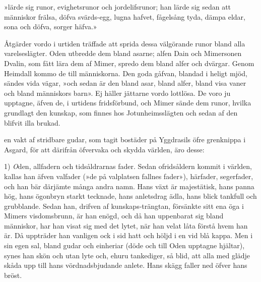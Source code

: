 {»lärde sig runor,}
{evighetsrunor}
{och jordelifsrunor;}
{han lärde sig sedan}
{att människor frälsa,}
{döfva svärds-egg,}
{lugna hafvet,}
{fågelsång tyda,}
{dämpa eldar,}
{sona och döfva,}
{sorger häfva.»}

Åtgärder vordo i urtiden träffade att sprida dessa välgörande runor
bland alla varelseslägter. Oden utbredde dem
bland asarne; alfen Dain och Mimersonen Dvalin, som fått lära dem af
Mimer, spredo dem bland alfer och dvärgar. Genom Heimdall kommo de till
människorna. Den goda gåfvan, blandad i heligt mjöd, sändes vida vägar,
»och sedan är den bland asar, bland alfer, bland visa vaner och bland
människors barn». Ej häller jättarne vordo lottlösa. De voro ju
upptagne, äfven de, i urtidens fridsförbund, och Mimer sände dem runor,
hvilka grundlagt den kunskap, som finnes hos Jotunheimsslägten och sedan
af den blifvit illa brukad.



\dropcapD en vakt af stridbare gudar, som tagit bostäder på Yggdrasils öfre
grenknippa i Asgard, för att därifrån öfvervaka och skydda världen, äro
desse:

1) {\emph Oden}, allfadern och tidsåldrarnas fader. Sedan ofridsåldern
kommit i världen, kallas han äfven valfader (»de på valplatsen fallnes
fader»), härfader, segerfader, och han bär därjämte många andra namn.
Hans växt är majestätisk, hans panna hög, hans ögonbryn starkt tecknade,
hans anletsdrag ädla, hans blick tankfull och grubblande. Sedan han,
drifven af kunskaps-trängtan, försänkte sitt ena öga i Mimers
visdomsbrunn, är han enögd, och då han uppenbarat sig bland människor,
har han visat sig med det lytet, när han velat låta förstå hvem han är.
Då uppträder han vanligen ock i sid hatt och höljd i en vid blå kappa.
Men i sin egen sal, bland gudar och einheriar (döde och till Oden
upptagne hjältar), synes han skön och utan lyte och, ehuru tankediger,
så blid, att alla med glädje skåda upp till hans vördnadsbjudande
anlete. Hans skägg faller ned öfver hans bröst.

